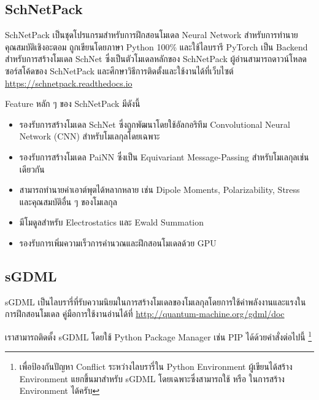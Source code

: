 \subsection{SchNetPack}
\label{ssec:lib_schnetpack}

SchNetPack เป็นชุดโปรแกรมสำหรับการฝึกสอนโมเดล Neural Network สำหรับการทำนายคุณสมบัติเชิงอะตอม\autocite{schutt2019}
ถูกเขียนโดยภาษา Python 100\% และใช้ไลบรารี PyTorch เป็น Backend สำหรับการสร้างโมเดล SchNet ซึ่งเป็นตัวโมเดลหลักของ SchNetPack
ผู้อ่านสามารถดาวน์โหลดซอร์สโค้ดของ SchNetPack และศึกษาวิธีการติดตั้งและใช้งานได้ที่เว็บไซต์ \url{https://schnetpack.readthedocs.io}

\noindent Feature หลัก ๆ ของ SchNetPack มีดังนี้
%
\begin{itemize}[topsep=0pt,noitemsep]\setlength\itemsep{0.5em}
    \item รองรับการสร้างโมเดล SchNet ซึ่งถูกพัฒนาโดยใช้อัลกอริทึม Convolutional Neural Network (CNN) สำหรับโมเลกุลโดยเฉพาะ%
    \autocite{schutt2017,schutt2017a}
    
    \item รองรับการสร้างโมเดล PaiNN ซึ่งเป็น Equivariant Message-Passing สำหรับโมเลกุลเช่นเดียวกัน\autocite{schutt2021}
    
    \item สามารถทำนายค่าเอาต์พุตได้หลากหลาย เช่น Dipole Moments, Polarizability, Stress และคุณสมบัติอื่น ๆ ของโมเลกุล
    
    \item มีโมดูลสำหรับ Electrostatics และ Ewald Summation
    
    \item รองรับการเพิ่มความเร็วการคำนวณและฝึกสอนโมเดลด้วย GPU
\end{itemize}

\subsection{sGDML}
\label{ssec:lib_sgdml}

sGDML เป็นไลบรารี่ที่รับความนิยมในการสร้างโมเดลของโมเลกุลโดยการใช้ค่าพลังงานและแรงในการฝึกสอนโมเดล\autocite{chmiela2019}
คู่มือการใช้งานอ่านได้ที่ \url{http://quantum-machine.org/gdml/doc}

\noindent เราสามารถติดตั้ง sGDML โดยใช้ Python Package Manager เช่น PIP ได้ด้วยคำสั่งต่อไปนี้%
\footnote{เพื่อป้องกันปัญหา Conflict ระหว่างไลบรารี่ใน Python Environment ผู้เขียนได้สร้าง Environment แยกขึ้นมาสำหรับ sGDML 
โดยเฉพาะซึ่งสามารถใช้  หรือ  ในการสร้าง Environment ได้ครับ}

